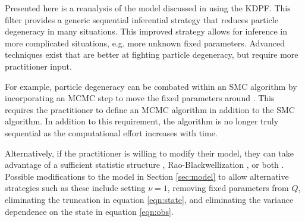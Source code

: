 
Presented here is a reanalysis of the model discussed in \citet{skvortsov2012monitoring} using the KDPF. This filter provides a generic sequential inferential strategy that reduces particle degeneracy in many situations. This improved strategy allows for inference in more complicated situations, e.g. more unknown fixed parameters. Advanced techniques exist that are better at fighting particle degeneracy, but require more practitioner input.

For example, particle degeneracy can be combated within an SMC algorithm by incorporating an MCMC step to move the fixed parameters around \citep{Gilk:Berz:foll:2001,Stor:part:2002}. This requires the practitioner to define an MCMC algorithm in addition to the SMC algorithm. In addition to this requirement, the algorithm is no longer truly sequential as the computational effort increases with time.

Alternatively, if the practitioner is willing to modify their model, they can take advantage of a sufficient statistic structure \citep{Fear:mark:2002}, Rao-Blackwellization \citep{Douc:Gods:Andr:on:2000}, or both \citep{carvalho2010particle}. Possible modifications to the model in Section \ref{sec:model} to allow alternative strategies such as these include setting $\nu=1$, removing fixed parameters from $Q$, eliminating the truncation in equation \eqref{eqn:state}, and eliminating the variance dependence on the state in equation \eqref{eqn:obs}.


